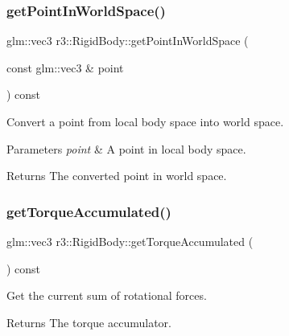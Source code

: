 \subsubsection{\texorpdfstring{get\+Point\+In\+World\+Space()}{getPointInWorldSpace()}}
{\footnotesize\ttfamily glm\+::vec3 r3\+::\+Rigid\+Body\+::get\+Point\+In\+World\+Space (\begin{DoxyParamCaption}\item[{const glm\+::vec3 \&}]{point }\end{DoxyParamCaption}) const}



Convert a point from local body space into world space. 


\begin{DoxyParams}{Parameters}
{\em point} & A point in local body space. \\
\hline
\end{DoxyParams}
\begin{DoxyReturn}{Returns}
The converted point in world space. 
\end{DoxyReturn}
\mbox{\label{classr3_1_1_rigid_body_a8a5111fa2e4bd5f3a2615525da4c2949}} 
\subsubsection{\texorpdfstring{get\+Torque\+Accumulated()}{getTorqueAccumulated()}}
{\footnotesize\ttfamily glm\+::vec3 r3\+::\+Rigid\+Body\+::get\+Torque\+Accumulated (\begin{DoxyParamCaption}{ }\end{DoxyParamCaption}) const}



Get the current sum of rotational forces. 

\begin{DoxyReturn}{Returns}
The torque accumulator. 
\end{DoxyReturn}
\mbox{\label{classr3_1_1_rigid_body_a5a96949cb2103e3c4d563849a6c8fb94}} 
